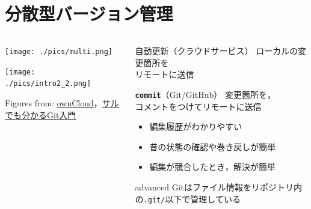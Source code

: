 \documentclass[12pt,dvipdfmx,svgnames,uplatex,aspectratio=169]{beamer}
\newcommand{\git}[1]{{\colorbox{WhiteSmoke}{\texttt{\textbf{#1}}}}}  %
\begin{document}
\section{分散型バージョン管理}
\begin{frame}{\insertsection}
  \begin{columns}[c] %
    \begin{column}{0.5\textwidth}
      \texttt{[image: ./pics/multi.png]}

      \texttt{[image: ./pics/intro2\_2.png]}

      \scriptsize{Figures from: \href{https://owncloud.jp}{ownCloud}，\href{https://backlog.com/ja/git-tutorial/}{サルでも分かるGit入門}}
    \end{column}
    \begin{column}{0.5\textwidth}
      \begin{block}{自動更新（クラウドサービス）}
        ローカルの変更箇所を\\リモートに送信
      \end{block}
      \hspace{\baselineskip}
      \begin{block}{\git{commit}（Git/GitHub）}
        変更箇所を，\\コメントをつけてリモートに送信
        \begin{itemize}
          \item 編集履歴がわかりやすい
          \item 昔の状態の確認や巻き戻しが簡単
          \item 編集が競合したとき，解決が簡単
        \end{itemize}
        \begin{beamercolorbox}[rounded=true]{advanced}
          \footnotesize{
            Gitはファイル情報をリポジトリ内の\texttt{.git/}以下で管理している
            }
        \end{beamercolorbox}
      \end{block}
    \end{column}
  \end{columns}
\end{frame}
\end{document}
